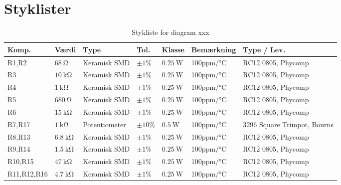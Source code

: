 \chapter{Styklister} \label{bilag:styklister}

\begin{table}[h!]
\small
\centering
\caption{Stykliste for diagram xxx}
\label{tab:udstyr}
\begin{threeparttable}
\begin{tabular}{ l l l l l l l }
\toprule
\multicolumn{1}{l}{\textbf{Komp.}}       &
\multicolumn{1}{l}{\textbf{Værdi}}       &
\multicolumn{1}{l}{\textbf{Type}}       &
\multicolumn{1}{l}{\textbf{Tol.}} &
\multicolumn{1}{l}{\textbf{Klasse}} &
\multicolumn{1}{l}{\textbf{Bemærkning}} &
\multicolumn{1}{l}{\textbf{Type / Lev.}}  \\ 
\hline
R1,R2 & $\SI{68}{\ohm}$			& Keramisk	SMD	& $\pm 1\%$ 		 & $\SI{0.25}{\watt}$	  & 100ppm/\si{\celsius}  & RC12 0805, Phycomp \\
R3 & $\SI{10}{\kilo\ohm}$		& Keramisk	SMD	& $\pm 1\%$ 		 & $\SI{0.25}{\watt}$	  & 100ppm/\si{\celsius}  & RC12 0805, Phycomp \\
R4 & $\SI{1}{\kilo\ohm}$		& Keramisk	SMD	& $\pm 1\%$ 		 & $\SI{0.25}{\watt}$	  & 100ppm/\si{\celsius}  & RC12 0805, Phycomp \\
R5 & $\SI{680}{\ohm}$			& Keramisk	SMD	& $\pm 1\%$ 		 & $\SI{0.25}{\watt}$	  & 100ppm/\si{\celsius}  & RC12 0805, Phycomp \\
R6 & $\SI{15}{\kilo\ohm}$		& Keramisk	SMD	& $\pm 1\%$ 		 & $\SI{0.25}{\watt}$	  & 100ppm/\si{\celsius}  & RC12 0805, Phycomp \\
R7,R17 & $\SI{1}{\kilo\ohm}$		& Potentiometer		& $\pm 10\%$ 		 & $\SI{0.5}{\watt}$	  & 100ppm/\si{\celsius}  & 3296 Square Trimpot, Bourns  \\
R8,R13 & $\SI{6.8}{\kilo\ohm}$		& Keramisk	SMD	& $\pm 1\%$ 		 & $\SI{0.25}{\watt}$	  & 100ppm/\si{\celsius}  & RC12 0805, Phycomp \\
R9,R14 & $\SI{1.5}{\kilo\ohm}$		& Keramisk	SMD	& $\pm 1\%$ 		 & $\SI{0.25}{\watt}$	  & 100ppm/\si{\celsius}  & RC12 0805, Phycomp \\
R10,R15 & $\SI{47}{\kilo\ohm}$		& Keramisk	SMD	& $\pm 1\%$ 		 & $\SI{0.25}{\watt}$	  & 100ppm/\si{\celsius}  & RC12 0805, Phycomp \\
R11,R12,R16 & $\SI{4.7}{\kilo\ohm}$		& Keramisk	SMD	& $\pm 1\%$ 		 & $\SI{0.25}{\watt}$	  & 100ppm/\si{\celsius}  & RC12 0805, Phycomp \\

\end{tabular}
\end{threeparttable}
\end{table}
